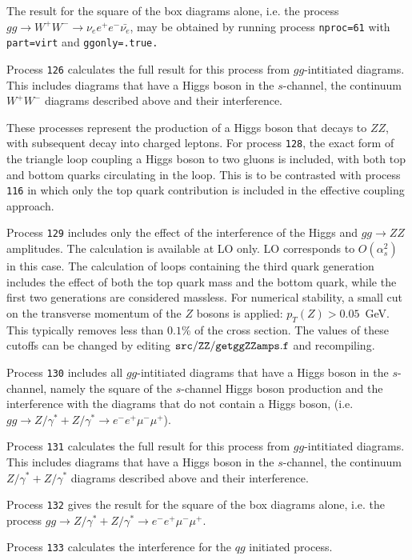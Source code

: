 The result for the square of the box diagrams alone, i.e. the process
$gg \to W^+W^- \to \nu_e e^+ e^- \bar{\nu_e}$, may be obtained by running process
{\tt nproc=61} with {\tt part=virt} and {\tt ggonly=.true.} 

Process {\tt 126} calculates the full result for this process from  $gg$-intitiated diagrams.
This includes diagrams that have a Higgs boson in the $s$-channel, the continuum $W^+W^-$
diagrams described above and their interference. 


These processes represent the production of a Higgs boson that decays to $Z Z$,
with subsequent decay into charged leptons. For process {\tt 128}, the exact form of the triangle
loop coupling a Higgs boson to two gluons is included, with both top and bottom quarks
circulating in the loop. This is to be contrasted with process {\tt 116} in which only the
top quark contribution is included in the effective coupling approach.

Process {\tt 129} includes only the effect of the interference of the
Higgs and $gg \to ZZ$ amplitudes.
The calculation is available at LO only. LO corresponds to $O(\alpha_s^2)$ in this case.
The calculation of loops containing the third quark generation
includes the effect of both the top quark mass and the bottom quark, while the first two
generations are considered massless. For numerical stability, a small cut on the
transverse momentum of the $Z$ bosons is applied: $p_T(Z)>0.05$~GeV.
This typically removes less than $0.1$\% of the cross section. The
values of these cutoffs can be changed by editing ${\tt src/ZZ/getggZZamps.f}$ and recompiling.

Process {\tt 130} includes all $gg$-intitiated diagrams that have a Higgs boson in the $s$-channel,
namely the square of the $s$-channel Higgs boson production and the interference with the diagrams
that do not contain a Higgs boson, (i.e. $gg \to Z/\gamma^*+Z/\gamma^* \to e^- e^+ \mu^- \mu^+$).

Process {\tt 131} calculates the full result for this process from  $gg$-intitiated diagrams.
This includes diagrams that have a Higgs boson in the $s$-channel, the continuum $ Z/\gamma^*+Z/\gamma^*$
diagrams described above and their interference. 

Process {\tt 132}  gives the result for the square of the box diagrams alone, i.e. the process
$gg \to Z/\gamma^*+Z/\gamma^* \to e^- e^+ \mu^- \mu^+$.

Process {\tt 133} calculates the interference for the $qg$ initiated process.


